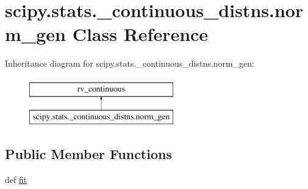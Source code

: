 \hypertarget{classscipy_1_1stats_1_1__continuous__distns_1_1norm__gen}{}\section{scipy.\+stats.\+\_\+continuous\+\_\+distns.\+norm\+\_\+gen Class Reference}
\label{classscipy_1_1stats_1_1__continuous__distns_1_1norm__gen}
Inheritance diagram for scipy.\+stats.\+\_\+continuous\+\_\+distns.\+norm\+\_\+gen\+:\begin{figure}[H]
\begin{center}
\leavevmode
\includegraphics[height=2.000000cm]{classscipy_1_1stats_1_1__continuous__distns_1_1norm__gen}
\end{center}
\end{figure}
\subsection*{Public Member Functions}
\begin{DoxyCompactItemize}
\item 
def \hyperlink{classscipy_1_1stats_1_1__continuous__distns_1_1norm__gen_ab472b2bd7b0366d6ab377248bb914385}{fit}
\end{DoxyCompactItemize}


